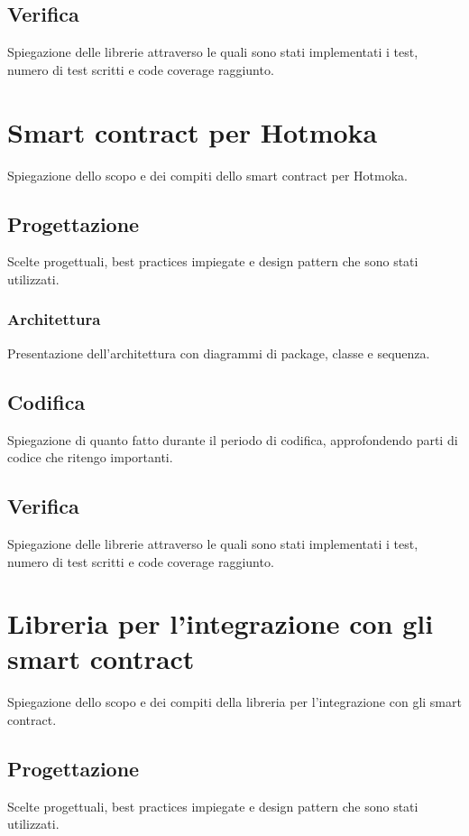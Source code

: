 \subsection{Verifica}
Spiegazione delle librerie attraverso le quali sono stati implementati i test, numero di test scritti e code coverage raggiunto.


\section{Smart contract per Hotmoka}
Spiegazione dello scopo e dei compiti dello smart contract per Hotmoka.

\subsection{Progettazione}
Scelte progettuali, best practices impiegate e design pattern che sono stati utilizzati. 

\subsubsection{Architettura}
Presentazione dell'architettura con diagrammi di package, classe e sequenza.

\subsection{Codifica}
Spiegazione di quanto fatto durante il periodo di codifica, approfondendo parti di codice che ritengo importanti.

\subsection{Verifica}
Spiegazione delle librerie attraverso le quali sono stati implementati i test, numero di test scritti e code coverage raggiunto.


\section{Libreria per l'integrazione con gli smart contract}
Spiegazione dello scopo e dei compiti della libreria per l'integrazione con gli smart contract.

\subsection{Progettazione}
Scelte progettuali, best practices impiegate e design pattern che sono stati utilizzati. 

